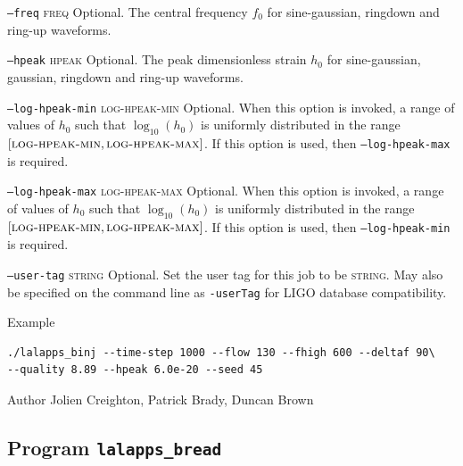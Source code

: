 \begin{entry}
\begin{entry}
\item[\texttt{--freq} \textsc{freq}]
Optional.  The central frequency $f_0$ for sine-gaussian,  ringdown and
ring-up waveforms.

\item[\texttt{--hpeak} \textsc{hpeak}]
Optional.  The peak dimensionless strain $h_0$ for sine-gaussian,  gaussian,  ringdown and
ring-up waveforms.

\item[\texttt{--log-hpeak-min} \textsc{log-hpeak-min}]
Optional.  When this option is invoked,  a range of values of $h_0$
such that $\log_{10}(h_0)$ is uniformly distributed in the range $[
\textsc{log-hpeak-min}, \textsc{log-hpeak-max}]$.  If this option is
used,  then \texttt{--log-hpeak-max} is required.

\item[\texttt{--log-hpeak-max} \textsc{log-hpeak-max}]
Optional.  When this option is invoked,  a range of values of $h_0$
such that $\log_{10}(h_0)$ is uniformly distributed in the range $[
\textsc{log-hpeak-min}, \textsc{log-hpeak-max}]$.  If this option is
used,  then \texttt{--log-hpeak-min} is required.

\item[\texttt{--user-tag} \textsc{string}] Optional. Set the user tag for this
job to be \textsc{string}. May also be specified on the command line as 
\texttt{-userTag} for LIGO database compatibility.

\end{entry}

\item[Example]
\begin{verbatim}
./lalapps_binj --time-step 1000 --flow 130 --fhigh 600 --deltaf 90\
--quality 8.89 --hpeak 6.0e-20 --seed 45
\end{verbatim}

\item[Author] 
Jolien Creighton, Patrick Brady, Duncan Brown
\end{entry}
\clearpage

\subsection{Program \texttt{lalapps\_bread}}
\label{program:lalapps-bread}


